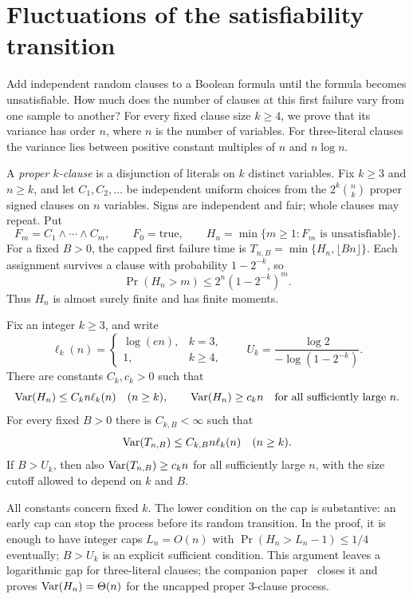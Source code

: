 \section{Fluctuations of the satisfiability transition}\label{sec:introduction}

Add independent random clauses to a Boolean formula until the formula
becomes unsatisfiable. How much does the number of clauses at this first
failure vary from one sample to another? For every fixed clause size
$k\ge4$, we prove that its variance has order $n$, where $n$ is the
number of variables. For three-literal clauses the variance lies between
positive constant multiples of $n$ and $n\log n$.

A \emph{proper $k$-clause} is a disjunction of literals on $k$ distinct
variables. Fix $k\ge3$ and $n\ge k$, and let $C_1,C_2,\ldots$ be
independent uniform choices from the $2^k\binom nk$ proper signed
clauses on $n$ variables. Signs are independent and fair; whole clauses
may repeat. Put
\[
 F_m=C_1\wedge\cdots\wedge C_m,\qquad F_0=\mathrm{true},\qquad
 H_n=\min\{m\ge1:F_m\text{ is unsatisfiable}\}.
\]
For a fixed $B>0$, the capped first failure time is
$T_{n,B}=\min\{H_n,\lfloor Bn\rfloor\}$.
Each assignment survives a clause with probability $1-2^{-k}$, so
\begin{equation}\label{eq:intro-first-moment}
 \Pr(H_n>m)\le2^n(1-2^{-k})^m.
\end{equation}
Thus $H_n$ is almost surely finite and has finite moments.

\begin{theorem}\label{thm:variance}
Fix an integer $k\ge3$, and write
\[
 \ell_k(n)=\begin{cases}\log(en),&k=3,\\1,&k\ge4,\end{cases}
 \qquad U_k=\frac{\log2}{-\log(1-2^{-k})}.
\]
There are constants $C_k,c_k>0$ such that
\[
 \operatorname{Var}(H_n)\le C_kn\ell_k(n)\quad(n\ge k),\qquad
 \operatorname{Var}(H_n)\ge c_kn\quad\text{for all sufficiently large }n.
\]
For every fixed $B>0$ there is $C_{k,B}<\infty$ such that
\[
 \operatorname{Var}(T_{n,B})\le C_{k,B}n\ell_k(n)\quad(n\ge k).
\]
If $B>U_k$, then also $\operatorname{Var}(T_{n,B})\ge c_kn$ for all sufficiently
large $n$, with the size cutoff allowed to depend on $k$ and $B$.
\end{theorem}

All constants concern fixed $k$. The lower condition on the cap is
substantive: an early cap can stop the process before its random
transition. In the proof, it is enough to have integer caps
$L_n=O(n)$ with $\Pr(H_n>L_n-1)\le1/4$ eventually;
$B>U_k$ is an explicit sufficient condition.
This argument leaves a logarithmic gap for three-literal clauses; the
companion paper~\cite{LinearThreeSATVariance} closes it and proves
$\operatorname{Var}(H_n)=\Theta(n)$ for the uncapped proper 3-clause process.

